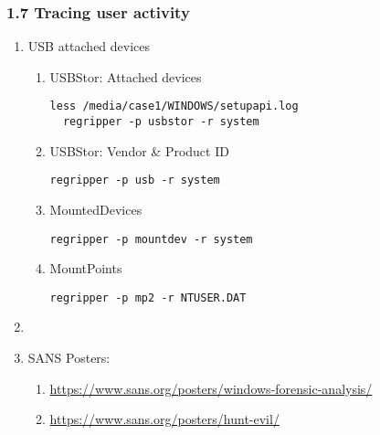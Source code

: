 \begin{frame}[fragile]
  \frametitle{1.7 Tracing user activity}
  \begin{enumerate}
	  \item[] USB attached devices
      \begin{enumerate}
	      \item[] USBStor: Attached devices
              \begin{lstlisting}[basicstyle=\tiny]
  less /media/case1/WINDOWS/setupapi.log
  regripper -p usbstor -r system
              \end{lstlisting}
              \item[] USBStor: Vendor \& Product ID
              \begin{lstlisting}[basicstyle=\tiny]
  regripper -p usb -r system
              \end{lstlisting}
              \item[] MountedDevices
              \begin{lstlisting}[basicstyle=\tiny]
  regripper -p mountdev -r system
              \end{lstlisting}
              \item[] MountPoints
              \begin{lstlisting}[basicstyle=\tiny]
  regripper -p mp2 -r NTUSER.DAT
              \end{lstlisting}
      \end{enumerate}
	  \item[] 
	  \item[] SANS Posters:
          \begin{enumerate}
	      \item[] \url{https://www.sans.org/posters/windows-forensic-analysis/}
	      \item[] \url{https://www.sans.org/posters/hunt-evil/}
	  \end{enumerate}
  \end{enumerate}
\end{frame}











